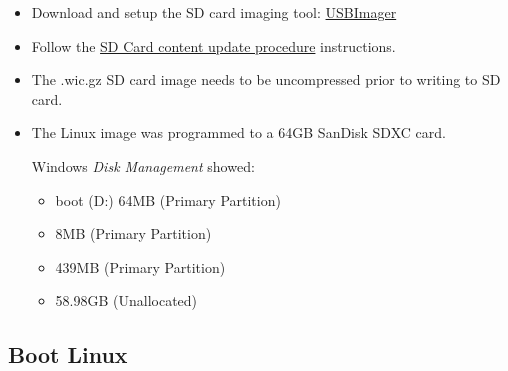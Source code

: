 \begin{enumerate}
\begin{itemize}
\item Download and setup the SD card imaging tool: \href{https://bztsrc.gitlab.io/usbimager}{USBImager}

\item Follow the
\href{https://github.com/polarfire-soc/polarfire-soc-documentation/blob/master/reference-designs-fpga-and-development-kits/updating-linux-in-mpfs-kit.md#sd-card-content-update-procedure}
{SD Card content update procedure}
instructions.

\item The .wic.gz SD card image needs to be uncompressed prior to writing to SD card.

\item The Linux image was programmed to a 64GB SanDisk SDXC card.

Windows \emph{Disk Management} showed:
\begin{itemize}
\item boot (D:) 64MB (Primary Partition)
\item 8MB (Primary Partition)
\item 439MB (Primary Partition)
\item 58.98GB (Unallocated)
\end{itemize}
%
\end{itemize}
\end{enumerate}

\clearpage
\subsection{Boot Linux}

